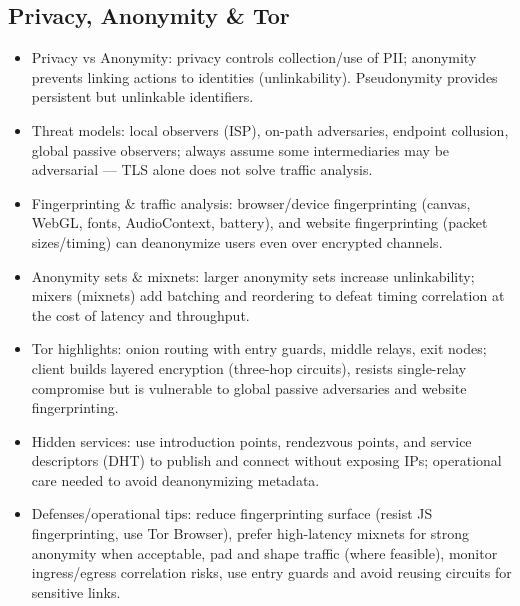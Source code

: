 \documentclass[12pt]{article}
\begin{document}
\subsection{Privacy, Anonymity \& Tor}
\begin{itemize}
  \item Privacy vs Anonymity: privacy controls collection/use of PII; anonymity prevents linking actions to identities (unlinkability). Pseudonymity provides persistent but unlinkable identifiers.
  \item Threat models: local observers (ISP), on-path adversaries, endpoint collusion, global passive observers; always assume some intermediaries may be adversarial --- TLS alone does not solve traffic analysis.
  \item Fingerprinting \& traffic analysis: browser/device fingerprinting (canvas, WebGL, fonts, AudioContext, battery), and website fingerprinting (packet sizes/timing) can deanonymize users even over encrypted channels.
  \item Anonymity sets \& mixnets: larger anonymity sets increase unlinkability; mixers (mixnets) add batching and reordering to defeat timing correlation at the cost of latency and throughput.
  \item Tor highlights: onion routing with entry guards, middle relays, exit nodes; client builds layered encryption (three-hop circuits), resists single-relay compromise but is vulnerable to global passive adversaries and website fingerprinting.
  \item Hidden services: use introduction points, rendezvous points, and service descriptors (DHT) to publish and connect without exposing IPs; operational care needed to avoid deanonymizing metadata.
  \item Defenses/operational tips: reduce fingerprinting surface (resist JS fingerprinting, use Tor Browser), prefer high-latency mixnets for strong anonymity when acceptable, pad and shape traffic (where feasible), monitor ingress/egress correlation risks, use entry guards and avoid reusing circuits for sensitive links.
\end{itemize}
\end{document}
